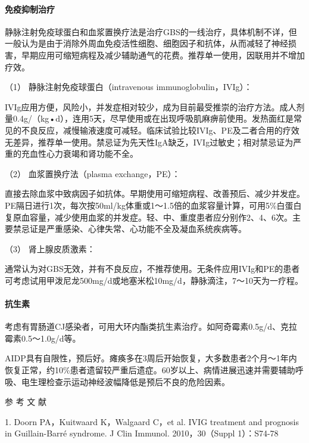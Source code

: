 \paragraph{免疫抑制治疗}

静脉注射免疫球蛋白和血浆置换疗法是治疗GBS的一线治疗，具体机制不详，但一般认为是由于消除外周血免疫活性细胞、细胞因子和抗体，从而减轻了神经损害，早期应用可缩短病程及减少辅助通气的花费。推荐单一使用，因联用并不增加疗效。

\hypertarget{text00260.htmlux5cux23CHP8-8-3-4-1}{}
（1） 静脉注射免疫球蛋白（intravenous immunoglobulin，IVIg）：

IVIg应用方便，风险小，并发症相对较少，成为目前最受推崇的治疗方法。成人剂量0.4g/（kg•d），连用5天，尽早使用或在出现呼吸肌麻痹前使用。发热面红是常见的不良反应，减慢输液速度可减轻。临床试验比较IVIg、PE及二者合用的疗效无差异，推荐单一使用。禁忌证为先天性IgA缺乏，IVIg过敏史；相对禁忌证为严重的充血性心力衰竭和肾功能不全。

\hypertarget{text00260.htmlux5cux23CHP8-8-3-4-2}{}
（2） 血浆置换疗法（plasma exchange，PE）：

直接去除血浆中致病因子如抗体。早期使用可缩短病程、改善预后、减少并发症。PE隔日进行1次，每次按50ml/kg体重或1～1.5倍的血浆容量计算，可用5\%白蛋白复原血容量，减少使用血浆的并发症。轻、中、重度患者应分别作2、4、6次。主要禁忌证是严重感染、心律失常、心功能不全及凝血系统疾病等。

\hypertarget{text00260.htmlux5cux23CHP8-8-3-4-3}{}
（3） 肾上腺皮质激素：

通常认为对GBS无效，并有不良反应，不推荐使用。无条件应用IVIg和PE的患者可考虑试用甲泼尼龙500mg/d或地塞米松10mg/d，静脉滴注，7～10天为一疗程。

\paragraph{抗生素}

考虑有胃肠道CJ感染者，可用大环内酯类抗生素治疗。如阿奇霉素0.5g/d、克拉霉素0.5～1.0g/d等。

AIDP具有自限性，预后好。瘫痪多在3周后开始恢复，大多数患者2个月～1年内恢复正常，约10\%患者遗留较严重后遗症。60岁以上、病情进展迅速并需要辅助呼吸、电生理检查示运动神经波幅降低是预后不良的危险因素。

\protect\hypertarget{text00261.html}{}{}

\hypertarget{text00261.htmlux5cux23CHP8-8-4}{}
参 考 文 献

1. Doorn PA，Kuitwaard K，Walgaard C，et al. IVIG treatment and
prognosis in Guillain-Barré syndrome. J Clin Immunol. 2010，30（Suppl
1）：S74-78

